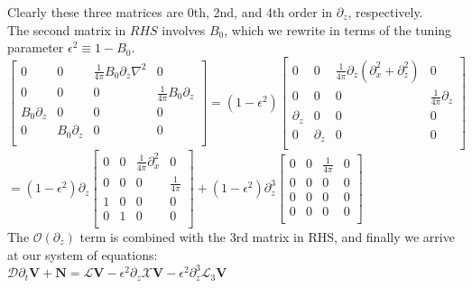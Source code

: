\documentclass[letterpaper,12pt]{article}
\begin{document}
Clearly these three matrices are 0th, 2nd, and 4th order in $\partial_z$, respectively. \\

The second matrix in $RHS$ involves $B_0$, which we rewrite in terms of the tuning parameter $\epsilon^2 \equiv 1 - B_0$. \\

$\left[\begin{matrix}
0 & 0 & \frac{1}{4\pi}B_0 \partial_z \nabla^2 & 0 \\
0 & 0 & 0 & \frac{1}{4\pi} B_0 \partial_z \\
B_0 \partial_z & 0 & 0 & 0 \\
0 & B_0 \partial_z & 0 & 0 \\ \end{matrix}\right] = (1 - \epsilon^2) \left[\begin{matrix}
0 & 0 & \frac{1}{4\pi}\partial_z(\partial_x^2 + \partial_z^2) & 0 \\
0 & 0 & 0 & \frac{1}{4\pi}\partial_z \\
\partial_z & 0 & 0 & 0 \\
0 & \partial_z & 0 & 0 \\ \end{matrix}\right] $ \\

$ = (1 - \epsilon^2)\partial_z\left[\begin{matrix}
0 & 0 & \frac{1}{4\pi}\partial_x^2 & 0 \\
0 & 0 & 0 & \frac{1}{4\pi} \\
1 & 0 & 0 & 0 \\
0 & 1 & 0 & 0 \\ \end{matrix} \right] + (1 - \epsilon^2)\partial_z^3 \left[\begin{matrix}
0 & 0 & \frac{1}{4\pi} & 0 \\
0 & 0 & 0 & 0 \\
0 & 0 & 0 & 0 \\
0 & 0 & 0 & 0 \\ \end{matrix} \right] $ \\

The $\mathcal{O}(\partial_z)$ term is combined with the 3rd matrix in RHS, and finally we arrive at our system of equations: \\

$\mathcal{D}\partial_t \mathbf{V} + \mathbf{N} = \mathcal{L} \mathbf{V} - \epsilon^2\partial_z\mathcal{X} \mathbf{V} - \epsilon^2 \partial_z^3 \mathcal{L}_3\mathbf{V}$ \\
\end{document}
